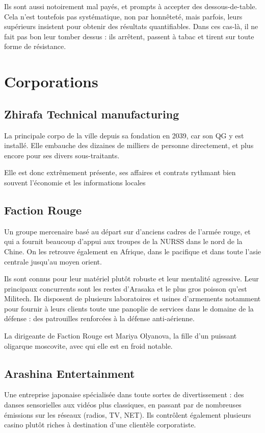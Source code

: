 \documentclass[10pt,a4paper]{book}
\begin{document}
Ils sont aussi notoirement mal payés, et prompts à accepter des dessous-de-table. Cela n'est toutefois pas systématique, non par honnêteté, mais parfois, leurs supérieurs insistent pour obtenir des résultats quantifiables. Dans ces cas-là, il ne fait pas bon leur tomber dessus : ils arrêtent, passent à tabac et tirent sur toute forme de résistance.
\chapter{Corporations}
\section{Zhirafa Technical manufacturing}
La principale corpo de la ville depuis sa fondation en 2039, car son QG y est installé. Elle embauche des dizaines de milliers de personne directement, et plus encore pour ses divers sous-traitants.

Elle est donc extrêmement présente, ses affaires et contrats rythmant bien souvent l'économie et les informations locales
\section{Faction Rouge}
Un groupe mercenaire basé au départ sur d'anciens cadres de l'armée rouge, et qui a fournit beaucoup d'appui aux troupes de la NURSS dans le nord de la Chine. On les retrouve également en Afrique, dans le pacifique et dans toute l'asie centrale jusqu'au moyen orient.

Ils sont connus pour leur matériel plutôt robuste et leur mentalité agressive. Leur principaux concurrents sont les restes d'Arasaka et le plus gros poisson qu'est Militech. Ils disposent de plusieurs laboratoires et usines d'armements notamment pour fournir à leurs clients toute une panoplie de services dans le domaine de la défense : des patrouilles renforcées à la défense anti-aérienne.

La dirigeante de Faction Rouge est Mariya Olyanova, la fille d'un puissant oligarque moscovite, avec qui elle est en froid notable.
\section{Arashina Entertainment}
Une entreprise japonaise spécialisée dans toute sortes  de divertissement : des danses sensorielles aux vidéos plus classiques, en passant par de nombreuses émissions sur les réseaux (radios, TV, NET). Ils contrôlent également plusieurs casino plutôt riches à destination d'une clientèle corporatiste.
\end{document}
